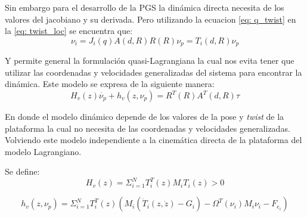 Sin embargo para el desarrollo de la PGS la dinámica directa necesita de los valores del jacobiano y su derivada. Pero utilizando la ecuacion \ref{eq: q_twist} en la \ref{eq: twist_loc} se encuentra que:
\begin{equation}
\nu_i = J_i(q) A(d,R) R(R) \nu_p = T_i(d,R) \nu_p
\end{equation}

Y permite general la formulación quasi-Lagrangiana la cual nos evita tener que utilizar las coordenadas y velocidades generalizadas del sistema para encontrar la dinámica. Este modelo se expresa de la siguiente manera:
\begin{equation}
H_v(z)\dot{\nu_p}+h_v(z,\nu_p) = R^T(R) A^T(d,R)\tau
\end{equation}

En donde el modelo dinámico depende de los valores de la pose y \emph{twist} de la plataforma la cual no necesita de las coordenadas y velocidades generalizadas. Volviendo este modelo independiente a la cinemática directa de la plataforma del modelo Lagrangiano.

Se define:
\begin{equation}
H_v(z) = \Sigma_{i=1}^N T_i^T(z)M_iT_i(z) > 0
\end{equation}

\begin{equation}
h_v(z,\nu_p) = \Sigma_{i=1}^N T_i^T(z) \left( M_i\left(\dot{T}_i(z,\dot{z}) - G_i\right) - \Omega^T(\nu_i)M_i\nu_i - F_{e_{i}} \right)
\end{equation}
